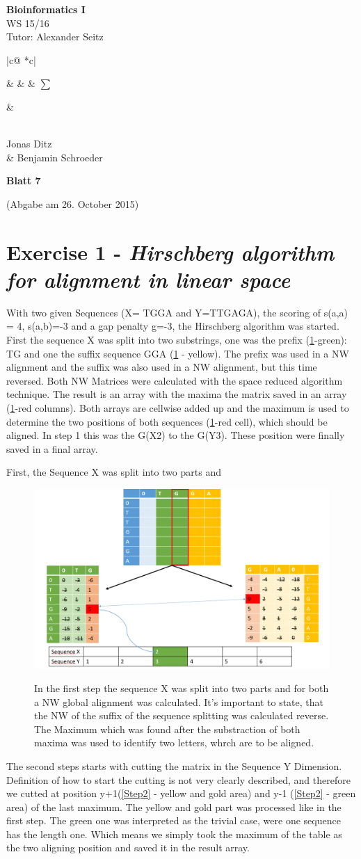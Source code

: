\documentclass[%
   10pt,              %
   nenglish,           %
   a4paper,           %
   DIV11,             %
]{scrartcl}%
\makeatletter
\def\header#1#2#3#4#5#6#7{\pagestyle{empty}
\noindent
\begin{minipage}[t]{0.6\textwidth}
\begin{flushleft}
\textbf{#4}\\%
#6\\%
Tutor: #2  %
\end{flushleft}
\end{minipage}
\begin{minipage}[t]{0.4\textwidth}
\begin{flushright}
\points{#7}%
\vspace*{0.2cm}
#5%
\end{flushright}
\end{minipage}

\begin{center}
{\Large\textbf{ Blatt #1}} %

{(Abgabe am #3)} %
\end{center}
}
\newenvironment{vartab}[1]
{
    \begin{tabular}{ |c@{} *{#1}{c|} } %
}{
    \end{tabular}
}
\newcommand{\myformat}[1]{& #1}
\newcommand{\numbers}[1]{
  \newcounter{ctra}
\setcounter{ctra}{1}
\whiledo {\value{ctra} < #1}%
{%
  \myformat{\thectra}
  \stepcounter{ctra}%
}
\myformat{\thectra}
}
\newcommand{\emptyLine}[1]{
  \newcounter{ctra1}
\setcounter{ctra}{1}
\whiledo {\value{ctra1} < #1}%
{%
  \myformat{\hspace*{0.5cm}}
  \stepcounter{ctra1}%
}
}
\newcommand{\points}[1]{
\newcounter{colmns}
\setcounter{colmns}{#1}
\stepcounter{colmns}
  \begin{vartab}{\thecolmns}
    \numbers{#1} & $\sum$\\\hline
    \emptyLine{\thecolmns}\\
  \end{vartab}
}
\makeatother
\begin{document}
\header{7}{Alexander Seitz}{26. October 2015}{Bioinformatics I}{\\Jonas Ditz \\\& Benjamin Schroeder}{WS 15/16}{3}

 \section*{Exercise 1 - \textsl{Hirschberg algorithm for alignment in linear space}}
  With two given Sequences (X= TGGA and Y=TTGAGA), the scoring of s(a,a) = 4, s(a,b)=-3 and a gap penalty g=-3, the Hirschberg algorithm was started. First the sequence X was split into two substrings, one was the prefix (\ref{Step1}-green): TG and one the suffix sequence GGA (\ref{Step1} - yellow). The prefix was used in a NW alignment and the suffix was also used in a NW alignment, but this time reversed. Both NW Matrices were calculated with the space reduced algorithm technique. The result is an array with the maxima the matrix saved in an array (\ref{Step1}-red columns). Both arrays are cellwise added up and the maximum is used to determine the two positions of both sequences (\ref{Step1}-red cell), which should be aligned. In step 1 this was the G(X2) to the G(Y3). These position were finally saved in a final array.
 
 First, the Sequence X was split into two parts and 
  \begin{figure}[h]
  	\includegraphics[scale=0.25]{img/Hirschberg_Step1.png}
  	\label{Step1}
  	\caption{In the first step the sequence X was split into two parts and for both a NW global alignment was calculated. It's important to state, that the NW of the suffix of the sequence splitting was calculated reverse. The Maximum which was found after the substraction of both maxima was used to identify two letters, whrch are to be aligned.}
  \end{figure}
  The second steps starts with cutting the  matrix in the Sequence Y Dimension. Definition of how to start the cutting is not very clearly described, and therefore we cutted at position y+1(\ref{Step2} - yellow and gold area) and y-1 (\ref{Step2} - green area) of the last maximum. The yellow and gold part was processed like in the first step. The green one was interpreted as the trivial case, were one sequence has the length one. Which means we simply took the maximum of the table as the two aligning position and saved it in the result array.
   
\end{document}
